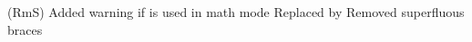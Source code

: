      {(RmS) Added warning if  is used in math mode}
     {Replaced  by }
     {Removed superfluous braces}
 \begin{macro}{\item}
    \begin{teX}
\def\item{%
  \@inmatherr\item
  \@ifnextchar [\@item{\@noitemargtrue \@item[\@itemlabel]}}
    \end{teX}
 \end{macro}
 \begin{macro}{\@donoparitem}
    \begin{teX}
\def\@donoparitem{%
  \@noparitemfalse
  \global\setbox\@labels\hbox{\hskip -\leftmargin
                               \unhbox\@labels
                                \hskip \leftmargin}%
  \if@minipage
    \else
      \@tempskipa\lastskip
      \vskip -\lastskip
      \advance\@tempskipa\@outerparskip
      \advance\@tempskipa -\parskip
      \vskip\@tempskipa
  \fi}
    \end{teX}
 \end{macro}

